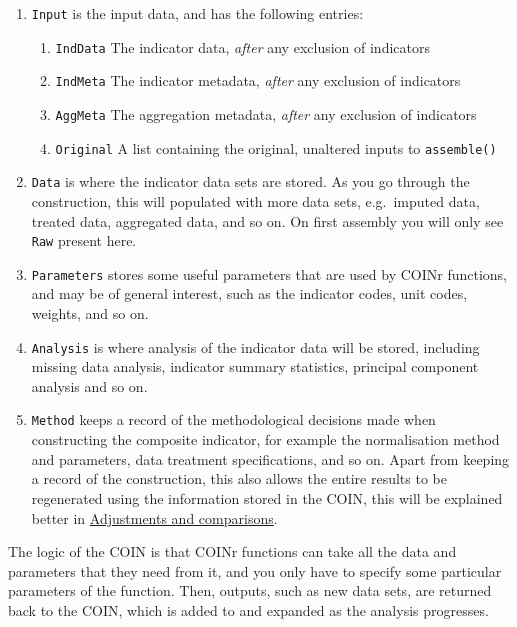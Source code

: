 \documentclass[
]{book}
\providecommand{\tightlist}{%
  \setlength{\itemsep}{0pt}\setlength{\parskip}{0pt}}
\begin{document}
\begin{enumerate}
\def\labelenumi{\arabic{enumi}.}
\tightlist
\item
  \texttt{Input} is the input data, and has the following entries:

  \begin{enumerate}
  \def\labelenumii{(\alph{enumii})}
  \tightlist
  \item
    \texttt{IndData} The indicator data, \emph{after} any exclusion of indicators
  \item
    \texttt{IndMeta} The indicator metadata, \emph{after} any exclusion of indicators
  \item
    \texttt{AggMeta} The aggregation metadata, \emph{after} any exclusion of indicators
  \item
    \texttt{Original} A list containing the original, unaltered inputs to \texttt{assemble()}
  \end{enumerate}
\item
  \texttt{Data} is where the indicator data sets are stored. As you go through the construction, this will populated with more data sets, e.g.~imputed data, treated data, aggregated data, and so on. On first assembly you will only see \texttt{Raw} present here.
\item
  \texttt{Parameters} stores some useful parameters that are used by COINr functions, and may be of general interest, such as the indicator codes, unit codes, weights, and so on.
\item
  \texttt{Analysis} is where analysis of the indicator data will be stored, including missing data analysis, indicator summary statistics, principal component analysis and so on.
\item
  \texttt{Method} keeps a record of the methodological decisions made when constructing the composite indicator, for example the normalisation method and parameters, data treatment specifications, and so on. Apart from keeping a record of the construction, this also allows the entire results to be regenerated using the information stored in the COIN, this will be explained better in \protect\hyperlink{adjustments-and-comparisons}{Adjustments and comparisons}.
\end{enumerate}

The logic of the COIN is that COINr functions can take all the data and parameters that they need from it, and you only have to specify some particular parameters of the function. Then, outputs, such as new data sets, are returned back to the COIN, which is added to and expanded as the analysis progresses.
\end{document}
